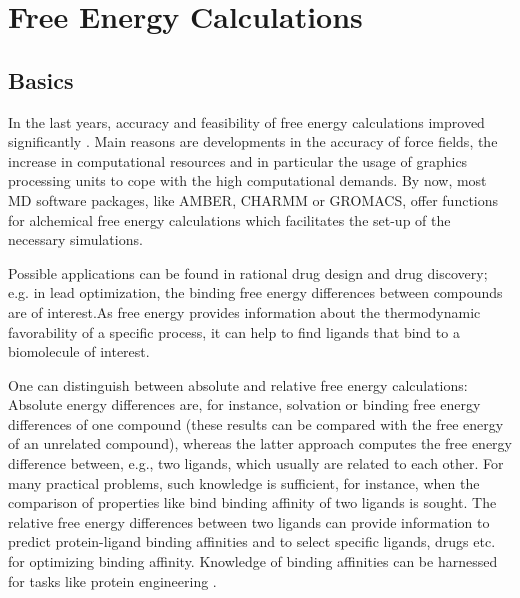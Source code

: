 \chapter{Free Energy Calculations}

\section{Basics}

In the last years, accuracy and feasibility of free energy calculations
improved significantly \cite{King.2021}. Main reasons are developments
in the accuracy of force fields\cite{Cournia.2017}, the increase
in computational resources and in particular the usage of graphics
processing units to cope with the high computational demands. By now,
most MD software packages, like AMBER, CHARMM or GROMACS, offer functions
for alchemical free energy calculations which facilitates the set-up
of the necessary simulations. 

Possible applications can be found in rational drug design and drug
discovery; e.g. in lead optimization, the binding free energy differences
between compounds are of interest.\cite{Cournia.2017}As free energy
provides information about the thermodynamic favorability of a specific
process, it can help to find ligands that bind to a biomolecule of
interest.

One can distinguish between absolute and relative free energy calculations:
Absolute energy differences are, for instance, solvation or binding
free energy differences of one compound (these results can be compared
with the free energy of an unrelated compound)\cite{Boresch.2003}\cite{Jorgensen.1988},
whereas the latter approach computes the free energy difference between,
e.g., two ligands, which usually are related to each other. For many
practical problems, such knowledge is sufficient, for instance, when
the comparison of properties like bind binding affinity of two ligands
is sought. The relative free energy differences between two ligands
can provide information to predict protein-ligand binding affinities
and to select specific ligands, drugs etc. for optimizing binding
affinity. Knowledge of binding affinities can be harnessed for tasks
like protein engineering \cite{King.2021}.

